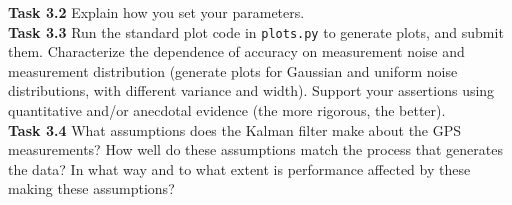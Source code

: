 \documentclass[a4paper]{article}
\begin{document}
\noindent
\textbf{Task 3.2} Explain how you set your parameters.\\

\noindent
\textbf{Task 3.3} Run the standard plot code in \texttt{plots.py} to generate plots, and submit them. Characterize the dependence of accuracy on measurement noise and measurement distribution (generate plots for Gaussian and uniform noise distributions, with different variance and width). Support your assertions using quantitative and/or anecdotal evidence (the more rigorous, the better).\\

\noindent
\textbf{Task 3.4} What assumptions does the Kalman filter make about the GPS measurements? How well do these assumptions match the process that generates the data? In what way and to what extent is performance affected by these making these assumptions?\\
\end{document}
